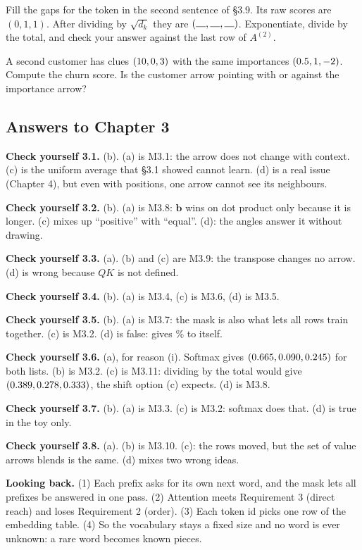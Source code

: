 \begin{exercise}
Fill the gaps for the token  in the second sentence of \S3.9. Its raw scores are $(0, 1, 1)$. After
dividing by $\sqrt{d_k}$ they are $(\rule{1em}{0.4pt}, \rule{1em}{0.4pt}, \rule{1em}{0.4pt})$. Exponentiate, divide by the
total, and check your answer against the last row of $A^{(2)}$.
\end{exercise}

\begin{exercise}
A second customer has clues $(10, 0, 3)$ with the same importances $(0.5, 1, -2)$. Compute the churn score. Is the
customer arrow pointing with or against the importance arrow?
\end{exercise}

\subsection*{Answers to Chapter 3}
\small
\textbf{Check yourself 3.1.} (b). (a) is M3.1: the arrow does not change with context. (c) is the uniform average
that \S3.1 showed cannot learn. (d) is a real issue (Chapter 4), but even with positions, one arrow cannot see its
neighbours.

\textbf{Check yourself 3.2.} (b). (a) is M3.8: $\bm{b}$ wins on dot product only because it is longer. (c) mixes up
``positive'' with ``equal''. (d): the angles answer it without drawing.

\textbf{Check yourself 3.3.} (a). (b) and (c) are M3.9: the transpose changes no arrow. (d) is wrong because $QK$ is
not defined.

\textbf{Check yourself 3.4.} (b). (a) is M3.4, (c) is M3.6, (d) is M3.5.

\textbf{Check yourself 3.5.} (b). (a) is M3.7: the mask is also what lets all rows train together. (c) is M3.2.
(d) is false:  gives \apctTime\% to itself.

\textbf{Check yourself 3.6.} (a), for reason (i). Softmax gives $(0.665, 0.090, 0.245)$ for both lists. (b) is M3.2. (c) is
M3.11: dividing by the total would give $(0.389, 0.278, 0.333)$, the shift option (c) expects. (d) is M3.8.

\textbf{Check yourself 3.7.} (b). (a) is M3.3. (c) is M3.2: softmax does that. (d) is true in the toy only.

\textbf{Check yourself 3.8.} (a). (b) is M3.10. (c): the rows moved, but the set of value arrows  blends is
the same. (d) mixes two wrong ideas.

\textbf{Looking back.} (1) Each prefix asks for its own next word, and the mask lets all prefixes be answered in one
pass. (2) Attention meets Requirement 3 (direct reach) and loses Requirement 2 (order). (3) Each token id picks one
row of the embedding table. (4) So the vocabulary stays a fixed size and no word is ever unknown: a rare word becomes
known pieces.

